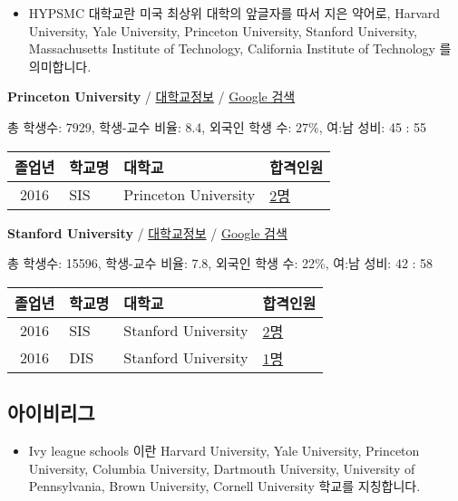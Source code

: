 \documentclass[13pt,]{article}
\providecommand{\tightlist}{%
  \setlength{\itemsep}{0pt}\setlength{\parskip}{0pt}}
\begin{document}
\begin{itemize}
\tightlist
\item
  HYPSMC 대학교란 미국 최상위 대학의 앞글자를 따서 지은 약어로, Harvard
  University, Yale University, Princeton University, Stanford
  University, Massachusetts Institute of Technology, California
  Institute of Technology 를 의미합니다.
\end{itemize}

\textbf{Princeton University} /
\href{https://www.timeshighereducation.com/world-university-rankings/princeton-university?ranking-dataset=589595}{대학교정보}
/ \href{http://www.google.com/search?q=Princeton+University}{Google
검색}

총 학생수: 7929, 학생-교수 비율: 8.4, 외국인 학생 수: 27\%, 여:남 성비:
45 : 55

\begin{longtable}[]{@{}clll@{}}
\toprule
졸업년 & 학교명 & 대학교 & 합격인원\tabularnewline
\midrule
\endhead
2016 & SIS & Princeton University &
\href{http://cafe.naver.com/assarabia/11589}{2명}\tabularnewline
\bottomrule
\end{longtable}

\textbf{Stanford University} /
\href{https://www.timeshighereducation.com/world-university-rankings/stanford-university?ranking-dataset=589595}{대학교정보}
/ \href{http://www.google.com/search?q=Stanford+University}{Google 검색}

총 학생수: 15596, 학생-교수 비율: 7.8, 외국인 학생 수: 22\%, 여:남 성비:
42 : 58

\begin{longtable}[]{@{}clll@{}}
\toprule
졸업년 & 학교명 & 대학교 & 합격인원\tabularnewline
\midrule
\endhead
2016 & SIS & Stanford University &
\href{http://cafe.naver.com/assarabia/11589}{2명}\tabularnewline
2016 & DIS & Stanford University &
\href{http://cafe.naver.com/assarabia/11591}{1명}\tabularnewline
\bottomrule
\end{longtable}

\subsection{아이비리그}

\begin{itemize}
\tightlist
\item
  Ivy league schools 이란 Harvard University, Yale University, Princeton
  University, Columbia University, Dartmouth University, University of
  Pennsylvania, Brown University, Cornell University 학교를 지칭합니다.
\end{itemize}
\end{document}

